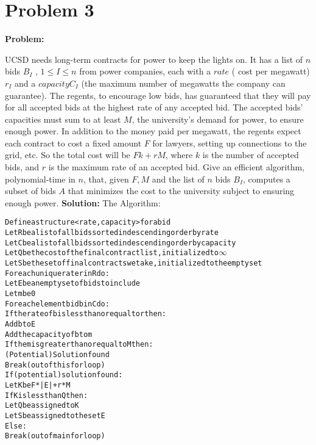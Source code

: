 \documentclass[11pt]{article}
\begin{document}
\section*{Problem 3} 
{\bf Problem:}

UCSD needs long-term contracts for power to keep the lights on. It has a list of $n$ bids $B_{I}$ , $1 \leq I \leq n$ from power companies, each with a $rate$ ( cost per megawatt) $r_{I}$ and a $capacity C_{I}$ (the maximum number of megawatts the company can guarantee). The regents, to encourage low bids, has guaranteed that they will pay for all accepted bids at the highest rate of any accepted bid. The accepted bids’ capacities must sum to at least $M$, the university’s demand for power, to ensure enough power. In addition to the money paid per megawatt, the regents expect each contract to cost a fixed amount $F$ for lawyers, setting up connections to the grid, etc. So the total cost will be $Fk + rM$, where $k$ is the number of accepted bids, and $r$ is the maximum rate of an accepted bid. Give an efficient algorithm, polynomial-time in $n$, that, given $F, M$ and the list of $n$ bids $B_{I}$, computes a subset of bids $A$ that minimizes the cost to the university subject to ensuring enough power. \newline \newline
{\bf Solution:} \newline \newline
The Algorithm:

\begin{alltt}
    Define a structure <rate, capacity> for a bid
    Let R be a list of all bids sorted in descending order by rate
    Let C be a list of all bids sorted in descending order by capacity
    Let Q be the cost of the final contract list, initialized to \(\infty\)
    Let S be the set of final contracts we take, initialized to the empty set
    For each unique rate r in R do:
        Let E be an empty set of bids to include
        Let m be 0
        For each element bid b in C do:
            If the rate of b is less than or equal to r then:
                Add b to E
                Add the capacity of b to m
                If the m is greater than or equal to M then:
                    (Potential) Solution found
                    Break (out of this for loop)
        If (potential) solution found:
            Let K be F*|E|+r*M
            If K is less than Q then: 
                Let Q be assigned to K
                Let S be assigned to the set E
        Else:
            Break (out of main for loop)
\end{alltt}
\end{document}
